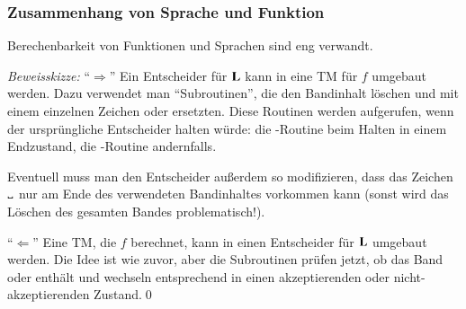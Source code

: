 \documentclass[onlymath]{beamer}
\begin{document}
\begin{frame}\frametitle{Zusammenhang von Sprache und Funktion}

Berechenbarkeit von Funktionen und Sprachen sind eng verwandt.

\pause

{\footnotesize
\emph{Beweisskizze:} "`$\Rightarrow$"' Ein Entscheider für $\textbf{\textcolor{black}{L}}$ kann in eine TM für $f$ umgebaut werden. Dazu verwendet man "`Subroutinen"', die den Bandinhalt löschen und mit einem einzelnen Zeichen  oder  ersetzten. Diese Routinen werden aufgerufen, wenn der ursprüngliche Entscheider halten würde: die -Routine beim Halten in einem Endzustand, die -Routine andernfalls.\medskip

{\tiny Eventuell muss man den Entscheider außerdem so modifizieren, dass das
Zeichen $\blank$ nur am Ende des verwendeten Bandinhaltes vorkommen kann (sonst wird das Löschen des gesamten Bandes problematisch!).

}
\smallskip

"`$\Leftarrow$"' Eine TM, die $f$ berechnet, kann in einen Entscheider für $\textbf{\textcolor{black}{L}}$ umgebaut werden. Die Idee ist wie zuvor, aber die Subroutinen prüfen jetzt, ob das Band  oder  enthält und wechseln entsprechend in einen akzeptierenden oder nicht-akzeptierenden Zustand.\qed

}

\end{frame}
\end{document}

